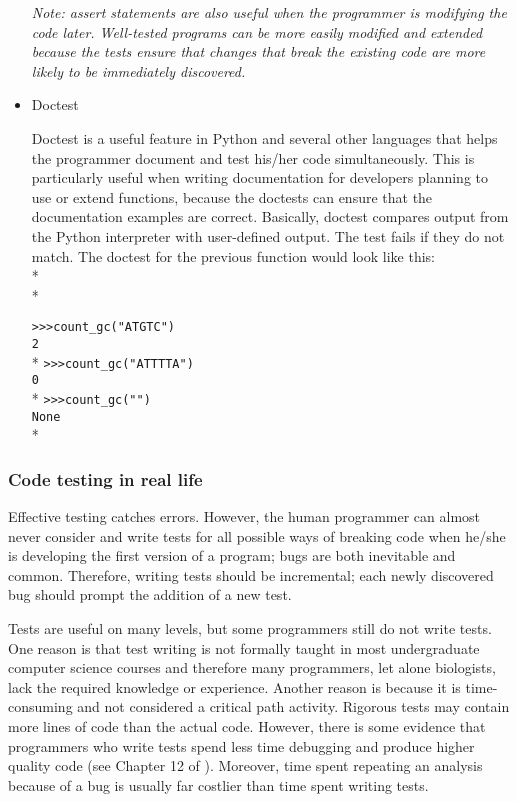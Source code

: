\documentclass[ChapterTOCs,krantz2]{krantz} %
\begin{document}
\begin{itemize}
\textsl{Note: assert
statements are also useful 
when the programmer is modifying the code later.
Well-tested programs can be more easily modified and extended because the
tests ensure that changes that break the existing code are more likely to
be immediately discovered.}

\item Doctest

Doctest is a useful feature in Python and several other languages that helps the 
programmer document
and test his/her code simultaneously. This is particularly useful when writing
documentation for developers planning to use or extend functions, because
the doctests can ensure that the documentation examples are correct.
 Basically, doctest compares output
from the Python interpreter with user-defined output. The test fails if they do
not match. The doctest for the previous function would look like this:\\*\\*

\texttt{>>>count\_gc("ATGTC") \\2}\\*
\texttt{>>>count\_gc("ATTTTA") \\0}\\*
\texttt{>>>count\_gc("")\\None}\\*

\end{itemize}

\subsubsection{Code testing in real life} 

Effective testing catches errors. However, the human programmer can almost
never consider and write tests for all possible ways of breaking code when
he/she is developing the first version of a program; bugs are both inevitable
and common.
Therefore, writing tests should be incremental; each newly discovered bug
should prompt the addition of a new test.

Tests are useful on many levels, but some programmers still do not
write tests\cite{Wilson2006}.  One reason is that test writing is not formally taught in most
undergraduate computer science courses and therefore many programmers, let
alone biologists, lack the required knowledge or experience.  Another reason is
because it is time-consuming and not considered a critical path activity\cite{Segal2007,Kelly2008}.
Rigorous tests may contain more lines of code than the actual code. 
However, there is some evidence that
programmers who write tests 
spend less time debugging and produce higher quality code
(see Chapter 12 of \cite{MakingSoftware}).
Moreover, time spent repeating an analysis because of a bug is usually far
costlier than time spent writing tests.
\end{document}

